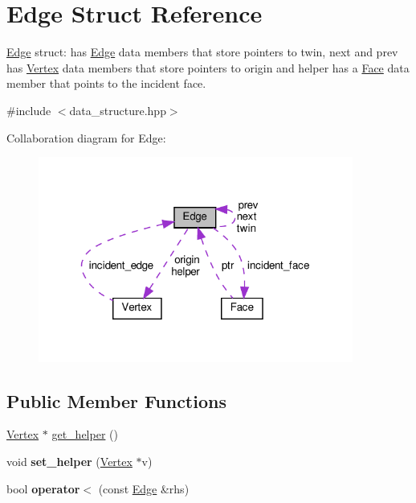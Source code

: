 \hypertarget{structEdge}{}\section{Edge Struct Reference}
\label{structEdge}


\hyperlink{structEdge}{Edge} struct\+: has \hyperlink{structEdge}{Edge} data members that store pointers to twin, next and prev has \hyperlink{structVertex}{Vertex} data members that store pointers to origin and helper has a \hyperlink{structFace}{Face} data member that points to the incident face.  




{\ttfamily \#include $<$data\+\_\+structure.\+hpp$>$}



Collaboration diagram for Edge\+:
\nopagebreak
\begin{figure}[H]
\begin{center}
\leavevmode
\includegraphics[width=293pt]{structEdge__coll__graph}
\end{center}
\end{figure}
\subsection*{Public Member Functions}
\begin{DoxyCompactItemize}
\item 
\hyperlink{structVertex}{Vertex} $\ast$ \hyperlink{structEdge_a3fe7e84f2ef319dbe30d48c4d268832d}{get\+\_\+helper} ()
\item 
\mbox{\label{structEdge_a8570e2155927300a0769e90a284d554c}} 
void {\bfseries set\+\_\+helper} (\hyperlink{structVertex}{Vertex} $\ast$v)
\item 
\mbox{\label{structEdge_a497ea9939f608695dde42a4362ff4714}} 
bool {\bfseries operator$<$} (const \hyperlink{structEdge}{Edge} \&rhs)
\end{DoxyCompactItemize}
